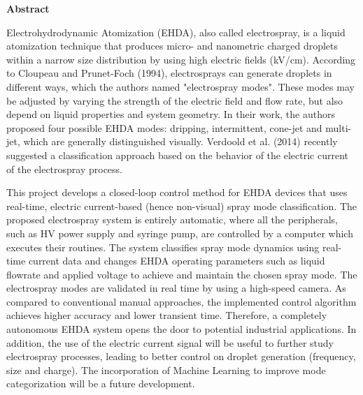 
\begin{center}
\huge{{\bf Abstract}}
\vspace{2cm}
\end{center}

    Electrohydrodynamic Atomization (EHDA), also called electrospray, is a liquid atomization technique that
    produces micro- and nanometric charged droplets within a narrow size distribution by using high electric fields (kV/cm).
    According to Cloupeau and Prunet-Foch\cite{prunet} (1994), electrosprays can generate droplets in different ways, which the authors
    named "electrospray modes". These modes may be adjusted by varying the strength of the electric field and flow rate,
    but also depend on liquid properties and system geometry. In their work, the authors proposed four possible EHDA
    modes: dripping, intermittent, cone-jet and multi-jet, which are generally distinguished visually. Verdoold et al.\cite{Sjaaks} (2014)
    recently suggested a classification approach based on the behavior of the electric current of the electrospray process.
    
    This project develops a closed-loop control method for EHDA devices that uses real-time, electric current-based (hence
    non-visual) spray mode classification.
    The proposed electrospray system is entirely automatic, where all the peripherals, such as HV power supply and syringe
    pump, are controlled by a computer which executes their routines.
    The system classifies spray mode dynamics using real-time current data and changes EHDA operating parameters such
    as liquid flowrate and applied voltage to achieve and maintain the chosen spray mode. The electrospray modes are
    validated in real time by using a high-speed camera.
    As compared to conventional manual approaches, the implemented control algorithm achieves higher
    accuracy and lower transient time. Therefore, a completely autonomous EHDA system opens the door to potential
    industrial applications. In addition, the use of the electric current signal will be useful to further study electrospray
    processes, leading to better control on droplet generation (frequency, size and charge). The incorporation of Machine
    Learning to improve mode categorization will be a future development.
 
\clearpage
\thispagestyle{empty}
\cleardoublepage

